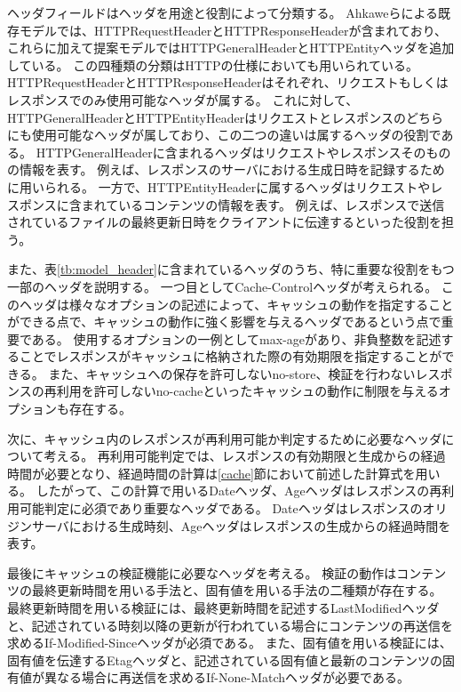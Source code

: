 \documentclass{css}
\begin{document}
ヘッダフィールドはヘッダを用途と役割によって分類する。
Ahkaweらによる既存モデル\cite{webmodel}では、HTTPRequestHeaderとHTTPResponseHeaderが含まれており、これらに加えて提案モデルではHTTPGeneralHeaderとHTTPEntityヘッダを追加している。
この四種類の分類はHTTPの仕様においても用いられている。
HTTPRequestHeaderとHTTPResponseHeaderはそれぞれ、リクエストもしくはレスポンスでのみ使用可能なヘッダが属する。
これに対して、HTTPGeneralHeaderとHTTPEntityHeaderはリクエストとレスポンスのどちらにも使用可能なヘッダが属しており、この二つの違いは属するヘッダの役割である。
HTTPGeneralHeaderに含まれるヘッダはリクエストやレスポンスそのものの情報を表す。
例えば、レスポンスのサーバにおける生成日時を記録するために用いられる。
一方で、HTTPEntityHeaderに属するヘッダはリクエストやレスポンスに含まれているコンテンツの情報を表す。
例えば、レスポンスで送信されているファイルの最終更新日時をクライアントに伝達するといった役割を担う。

また、表\ref{tb:model_header}に含まれているヘッダのうち、特に重要な役割をもつ一部のヘッダを説明する。
一つ目としてCache-Controlヘッダが考えられる。
このヘッダは様々なオプションの記述によって、キャッシュの動作を指定することができる点で、キャッシュの動作に強く影響を与えるヘッダであるという点で重要である。
使用するオプションの一例としてmax-ageがあり、非負整数を記述することでレスポンスがキャッシュに格納された際の有効期限を指定することができる。
また、キャッシュへの保存を許可しないno-store、検証を行わないレスポンスの再利用を許可しないno-cacheといったキャッシュの動作に制限を与えるオプションも存在する。

次に、キャッシュ内のレスポンスが再利用可能か判定するために必要なヘッダについて考える。
再利用可能判定では、レスポンスの有効期限と生成からの経過時間が必要となり、経過時間の計算は\ref{cache}節において前述した計算式を用いる。
したがって、この計算で用いるDateヘッダ、Ageヘッダはレスポンスの再利用可能判定に必須であり重要なヘッダである。
Dateヘッダはレスポンスのオリジンサーバにおける生成時刻、Ageヘッダはレスポンスの生成からの経過時間を表す。

最後にキャッシュの検証機能に必要なヘッダを考える。
検証の動作はコンテンツの最終更新時間を用いる手法と、固有値を用いる手法の二種類が存在する。
最終更新時間を用いる検証には、最終更新時間を記述するLastModifiedヘッダと、記述されている時刻以降の更新が行われている場合にコンテンツの再送信を求めるIf-Modified-Sinceヘッダが必須である。
また、固有値を用いる検証には、固有値を伝達するEtagヘッダと、記述されている固有値と最新のコンテンツの固有値が異なる場合に再送信を求めるIf-None-Matchヘッダが必要である。
\end{document}

